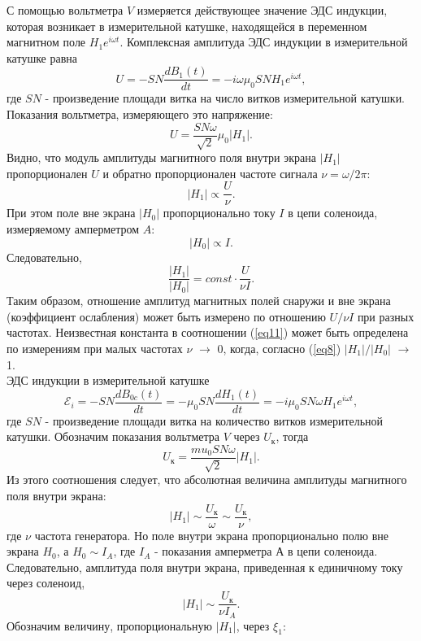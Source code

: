 \documentclass[a4paper,12pt]{article}
\theoremstyle{plain} %
\theoremstyle{definition} %
\theoremstyle{remark} %
\begin{document}
	\indent С помощью вольтметра $V$ измеряется действующее значение ЭДС индукции, которая возникает в измерительной катушке, находящейся в переменном магнитном поле $H_1 e^{i \omega t}$. Комплексная амплитуда ЭДС индукции в измерительной катушке равна 
	\begin{equation*}
		U = -SN \frac{dB_1 (t)}{dt} = -i \omega \mu_0 SN H_1 e^{i \omega t},
	\end{equation*}
	где $SN$ - произведение площади витка на число витков измерительной катушки. Показания вольтметра, измеряющего это напряжение:
	\begin{equation*}
		U = \frac{SN \omega}{\sqrt{2}} \mu_0 |H_1|.
	\end{equation*}
	\indent Видно, что модуль амплитуды магнитного поля внутри экрана $|H_1|$ пропорционален $U$ и обратно пропорционален частоте сигнала $\nu = \omega/2\pi$:
	\begin{equation*}
		|H_1| \propto \frac{U}{\nu}.
	\end{equation*}
	\indent При этом поле вне экрана $|H_0|$ пропорционально току $I$ в цепи соленоида, измеряемому амперметром $A$:
	\begin{equation}
		|H_0| \propto I.
	\end{equation}
	Следовательно, 
	\begin{equation} \label{eq11}
		\frac{|H_1|}{|H_0|} = const \cdot \frac{U}{\nu I}.
	\end{equation}
	\indent Таким образом, отношение амплитуд магнитных полей снаружи и вне экрана (коэффициент ослабления) может быть измерено по отношению $U/\nu I$ при разных частотах. Неизвестная константа в соотношении (\ref{eq11}) может быть определена по измерениям при малых частотах $\nu$ $\longrightarrow$ 0, когда, согласно (\ref{eq8}) $|H_1|/|H_0|$ $\longrightarrow$ 1.\\
	
	\indent ЭДС индукции в измерительной катушке 
	\begin{equation*}
		\mathcal{E}_i=-SN\dfrac{dB_{0c}(t)}{dt}=-\mu_0 SN \dfrac{dH_{1}(t)}{dt} = -i \mu_0 SN\omega H_{1} e^{i \omega t},
	\end{equation*}
	где $SN$ - произведение площади витка на количество витков измерительной катушки. Обозначим показания вольтметра $V$ через $U_{\text{к}}$, тогда 
	\begin{equation*}
		U_{\text{к}} = \dfrac{mu_0SN\omega}{\sqrt{2}}|H_{1}|.
	\end{equation*}
	Из этого соотношения следует, что абсолютная величина амплитуды магнитного поля внутри экрана: \\
	$$|H_{1}| \sim \dfrac{U_{\text{к}}}{\omega} \sim \dfrac{U_{\text{к}}}{\nu},$$ где $\nu$ частота генератора. Но поле внутри экрана пропорционально полю вне экрана $H_0$, а $H_0\sim I_A$, где $I_A$ - показания амперметра А в цепи соленоида. Следовательно, амплитуда поля внутри экрана, приведенная к единичному току через соленоид, $$|H_{1}| \sim \dfrac{U_{\text{к}}}{\nu I_A}.$$ Обозначим величину, пропорциональную $|H_{1}|$, через $\xi_{1}$:
	
\end{document}
